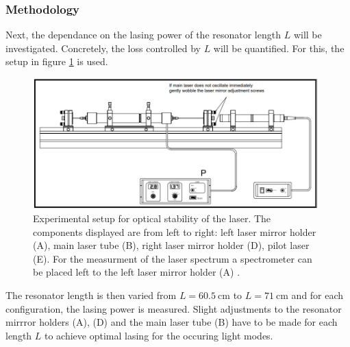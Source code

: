 \documentclass[../main.tex]{subfiles}
\begin{document}
    
\subsubsection*{Methodology}
    Next, the dependance on the lasing power of the resonator length $L$ will be investigated. Concretely, the loss controlled by $L$ will be quantified. For this, the setup in figure \ref{fig:4-Aufbau} is used.
    
    \begin{figure}[H]
        \centering 
        \includegraphics[width = 11cm]{Bilddateien/4/4-Aufbau.jpg}
        \caption{Experimental setup for optical stability of the laser. The components displayed are from left to right: left laser mirror holder (A), main laser tube (B), right laser mirror holder (D), pilot laser (E). For the measurment of the laser spectrum a spectrometer can be placed left to the left laser mirror holder (A) \cite[p.22]{doc:HeNeStudentManual}.}
        \label{fig:4-Aufbau}
    \end{figure}

    \noindent The resonator length is then varied from $L = \SI{60.5}{\cm}$ to $L = \SI{71}{\cm}$ and for each configuration, the lasing power is measured. Slight adjustments to the resonator mirrror holders (A), (D) and the main laser tube (B) have to be made for each length $L$ to achieve optimal lasing for the occuring light modes.
\end{document}
